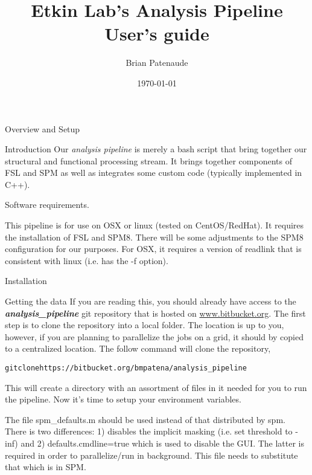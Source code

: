 \documentclass[]{report}
\begin{document}
\title{Etkin Lab's Analysis Pipeline User's guide}
\author{Brian Patenaude}
\date{\today}
\maketitle
\begin{chapter}{Overview and Setup}
\begin{section}{Introduction}
Our  {\it analysis pipeline} is merely a bash script that bring together our structural and functional processing stream. It brings together components of FSL and SPM as well as integrates some custom code (typically implemented in C++).  
\end{section}
\begin{section}{Software requirements.}

This pipeline is for use on OSX or linux (tested on CentOS/RedHat). It requires the installation of FSL and SPM8. There will be some adjustments to the SPM8 configuration for our purposes. For OSX, it requires a version of readlink that is consistent with linux (i.e. has the -f option).

\end{section}

\begin{section}{Installation}
\begin{subsection}{Getting the data}
If you are reading this, you should already have access to the {\bf \it analysis\_pipeline} git repository that is hosted on \url{www.bitbucket.org}. The first step is to clone the repository into a local folder. The location is up to you, however, if you are planning to parallelize the jobs on a grid, it should by copied to a centralized location. The follow command will clone the repository, 

\begin{alltt}
\hspace*{0.5in} 	git clone https://bitbucket.org/bmpatena/analysis_pipeline
\end{alltt}

This will create a directory with an assortment of files in it needed for you to run the pipeline. Now it's time to setup your environment variables.

The file spm\_defaults.m should be used instead of that distributed by spm. There is two differences: 1) disables the implicit masking (i.e. set threshold to -inf)  and 2) defaults.cmdline=true which is used to disable the GUI. The latter is required in order to parallelize/run in background. This file needs to substitute that which is in SPM.



\end{subsection}
\end{section}
\end{chapter}
\end{document}
